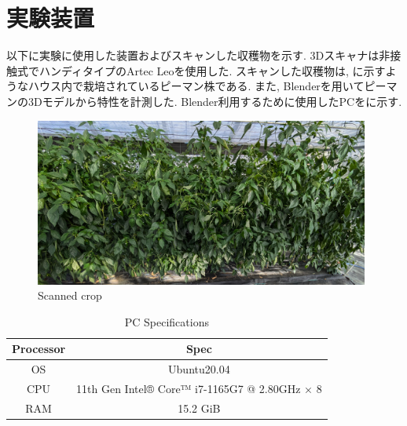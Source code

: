 \section{実験装置}
以下に実験に使用した装置およびスキャンした収穫物を示す.
3Dスキャナは非接触式でハンディタイプのArtec Leoを使用した.
スキャンした収穫物は, に示すようなハウス内で栽培されているピーマン株である.
また, Blenderを用いてピーマンの3Dモデルから特性を計測した.
Blender利用するために使用したPCをに示す.

\begin{figure}[H]
   \centering
   \includegraphics[width=110mm]{images/png/plant.png}
   \caption{Scanned crop}
   \label{Fig:plant}
\end{figure}

\begin{table}[H]
  \begin{center}
    \begin{tabular}{c|c}
      Processor & Spec\\ \hline\hline
      OS & Ubuntu20.04\\ \hline
      CPU & 11th Gen Intel® Core™ i7-1165G7 @ 2.80GHz × 8\\ \hline
      RAM & 15.2 GiB\\ \hline
    \end{tabular}
    \caption{PC Specifications}
    \label{Tab:pc}
  \end{center}
\end{table}